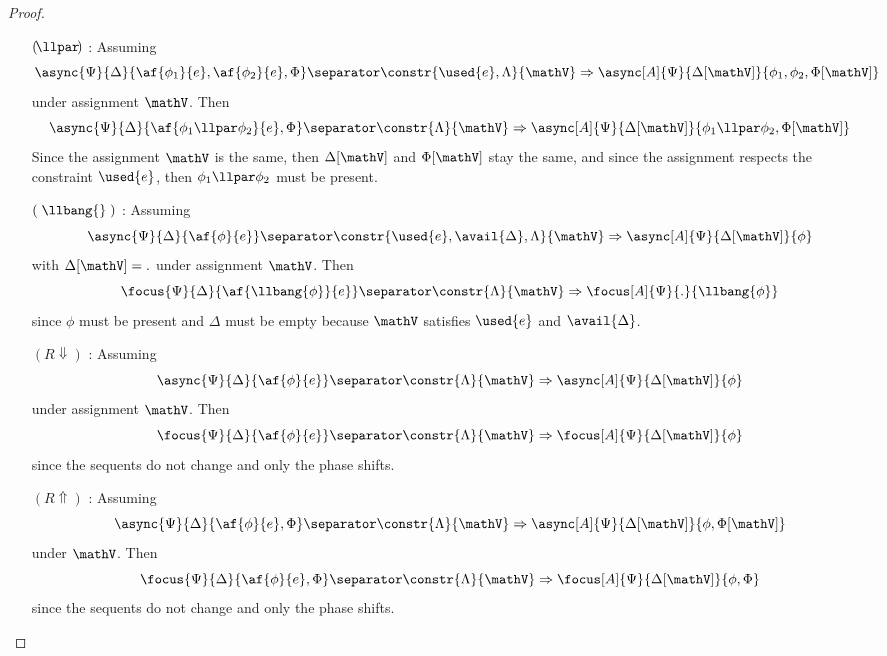 \begin{proof}
\begin{itemize}
		\item[$(\!\llpar\!)$]: Assuming
			$$ \async{\Psi}{\Delta}{\af{\phi_1}{e}, \af{\phi_2}{e}, \Phi} \separator \constr{\used{e}, \Lambda}{\mathV} \Rightarrow \async[A]{\Psi}{\Delta[\mathV]}{\phi_1, \phi_2, \Phi[\mathV]} $$
			under assignment $\mathV$.
			Then 
			$$ \async{\Psi}{\Delta}{\af{\phi_1 \llpar \phi_2}{e}, \Phi} \separator \constr{\Lambda}{\mathV} \Rightarrow \async[A]{\Psi}{\Delta[\mathV]}{\phi_1 \llpar \phi_2, \Phi[\mathV]} $$
			Since the assignment $\mathV$ is the same, then $\Delta[\mathV]$ and $\Phi[\mathV]$ stay the same, and since the assignment respects the constraint $\used{e}$, then $\phi_1 \llpar \phi_2$ must be present.
		\item[$(\;\llbang{}\;)$]: Assuming
			$$ \async{\Psi}{\Delta}{\af{\phi}{e}} \separator \constr{\used{e}, \avail{\Delta}, \Lambda}{\mathV} \Rightarrow \async[A]{\Psi}{\Delta[\mathV]}{\phi} $$
			with $\Delta[\mathV] = .$ under assignment $\mathV$.
			Then
			$$ \focus{\Psi}{\Delta}{\af{\llbang{\phi}}{e}} \separator \constr{\Lambda}{\mathV} \Rightarrow \focus[A]{\Psi}{.}{\llbang{\phi}} $$
			since $\phi$ must be present and $\Delta$ must be empty because $\mathV$ satisfies $\used{e}$ and $\avail{\Delta}$.
		\item[$(R\!\Downarrow)$]: Assuming
			$$ \async{\Psi}{\Delta}{\af{\phi}{e}} \separator \constr{\Lambda}{\mathV} \Rightarrow \async[A]{\Psi}{\Delta[\mathV]}{\phi} $$
			under assignment $\mathV$.
			Then
			$$ \focus{\Psi}{\Delta}{\af{\phi}{e}} \separator \constr{\Lambda}{\mathV} \Rightarrow \focus[A]{\Psi}{\Delta[\mathV]}{\phi} $$
			since the sequents do not change and only the phase shifts.
		\item[$(R\!\Uparrow)$]: Assuming
			$$ \async{\Psi}{\Delta}{\af{\phi}{e}, \Phi} \separator \constr{\Lambda}{\mathV} \Rightarrow \async[A]{\Psi}{\Delta[\mathV]}{\phi, \Phi[\mathV]} $$
			under $\mathV$.
			Then
			$$ \focus{\Psi}{\Delta}{\af{\phi}{e}, \Phi} \separator \constr{\Lambda}{\mathV} \Rightarrow \focus[A]{\Psi}{\Delta[\mathV]}{\phi, \Phi} $$
			since the sequents do not change and only the phase shifts.
	\end{itemize}
	\begin{center}

\end{center}
\end{proof}
